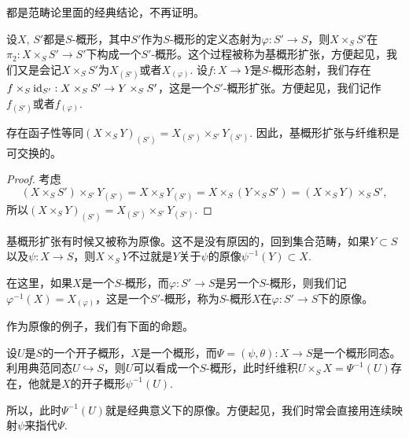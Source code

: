 都是范畴论里面的经典结论，不再证明。

\begin{para}[基概形扩张]
设$X$, $S'$都是$S$-概形，其中$S'$作为$S$-概形的定义态射为$\varphi:S'\to S$，则$X\times_S S'$在$\pi_2:X\times_S S'\to S'$下构成一个$S'$-概形。这个过程被称为基概形扩张，方便起见，我们又是会记$X\times_S S'$为$X_{(S')}$或者$X_{(\varphi)}$. 设$f:X\to Y$是$S$-概形态射，我们存在$f\times_S \operatorname{id}_{S'}:X\times_S S'\to Y\times_S S'$，这是一个$S'$-概形扩张。方便起见，我们记作$f_{(S')}$或者$f_{(\varphi)}$. 
\end{para}

\begin{pro}
存在函子性等同$(X\times_S Y)_{(S')}=X_{(S')}\times_{S'} Y_{(S')}$. 因此，基概形扩张与纤维积是可交换的。
\end{pro}

\begin{proof}
考虑
\[
	(X\times_S S')\times_{S'}Y_{(S')}=X\times_{S}Y_{(S')}=X\times_{S}(Y\times_S S')=(X\times_{S} Y)\times_S S',
\]
所以$(X\times_S Y)_{(S')}=X_{(S')}\times_{S'} Y_{(S')}$.
\end{proof}

\begin{para}[原像]
基概形扩张有时候又被称为原像。这不是没有原因的，回到集合范畴，如果$Y\subset S$以及$\psi:X\to S$，则$X\times_S Y$不过就是$Y$关于$\psi$的原像$\psi^{-1}(Y)\subset X$. 

在这里，如果$X$是一个$S$-概形，而$\varphi:S'\to S$是另一个$S$-概形，则我们记$\varphi^{-1}(X)=X_{(\varphi)}$，这是一个$S'$-概形，称为$S$-概形$X$在$\varphi:S'\to S$下的原像。
\end{para}

作为原像的例子，我们有下面的命题。

\begin{pro}\label{preimage}
设$U$是$S$的一个开子概形，$X$是一个概形，而$\Psi=(\psi,\theta):X\to S$是一个概形同态。利用典范同态$U\hookrightarrow S$，则$U$可以看成一个$S$-概形，此时纤维积$U\times_S X=\Psi^{-1}(U)$存在，他就是$X$的开子概形$\psi^{-1}(U)$.
\end{pro}

所以，此时$\Psi^{-1}(U)$就是经典意义下的原像。方便起见，我们时常会直接用连续映射$\psi$来指代$\Psi$.

